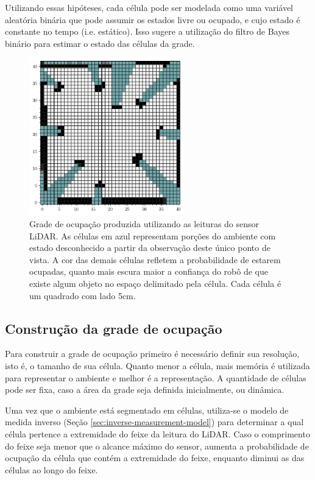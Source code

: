 Utilizando essas hipóteses, cada célula pode ser modelada como uma variável aleatória binária 
que pode assumir os estados livre ou ocupado, e cujo estado é constante 
no tempo (i.e. estático). Isso sugere a utilização 
do filtro de Bayes binário \cite[p.~94]{thrun2005probabilistic} para estimar o estado das células 
da grade.

\begin{figure}[]
  \centering
  \includegraphics[width=0.6\textwidth]{figs/grid_map_view_vec.pdf}
  \caption[Grade de ocupação]{Grade de ocupação produzida utilizando as leituras do sensor LiDAR. As células em azul representam porções do ambiente com estado 
  desconhecido a partir da observação deste único ponto de vista. A 
  cor das demais células refletem a probabilidade de estarem ocupadas,
  quanto mais escura maior a confiança do robô de que existe algum 
  objeto no espaço delimitado pela célula. Cada célula é um quadrado 
  com lado 5cm.}
  \label{fig:occuopancy-grid-represetation}
\end{figure}

\subsection{Construção da grade de ocupação}
Para construir a grade de ocupação primeiro é necessário definir sua 
resolução, isto é, o tamanho de sua célula. Quanto menor a célula, mais 
memória é utilizada para representar o ambiente e melhor é a 
representação. A quantidade de células pode ser fixa, caso a área da 
grade seja definida inicialmente, ou dinâmica.

Uma vez que o ambiente está segmentado em células, utiliza-se o modelo de 
medida inverso \invMeasurementModel (Seção \ref{sec:inverse-measurement-model}) para determinar a qual célula pertence 
a extremidade do feixe da leitura do LiDAR. Caso o comprimento do feixe 
seja menor que o alcance máximo do sensor, aumenta a probabilidade de ocupação da 
célula que contém a extremidade do feixe, enquanto diminui as das 
células ao longo do feixe.

